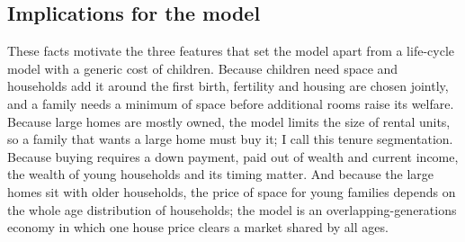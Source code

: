 \subsection{Implications for the model}

These facts motivate the three features that set the model apart from a
life-cycle model with a generic cost of children. Because children need
space and households add it around the first birth, fertility and housing
are chosen jointly, and a family needs a minimum of space before additional
rooms raise its welfare. Because large homes are mostly owned, the model
limits the size of rental units, so a family that wants a large home must buy
it; I call this tenure segmentation. Because buying requires a down payment,
paid out of wealth and current income, the wealth of young households and its
timing matter.
And because the large homes sit with older households, the price of space for
young families depends on the whole age distribution of households; the model
is an overlapping-generations economy in which one house price clears a
market shared by all ages.

